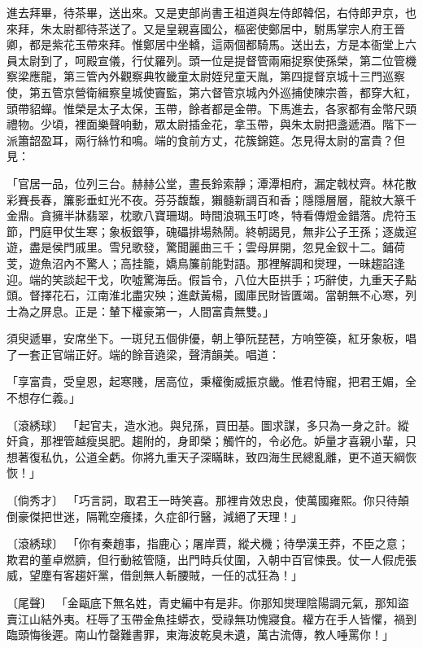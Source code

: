 \begin{showcontents}{}
進去拜畢，待茶畢，送出來。又是吏部尚書王祖道與左侍郎韓侶，右侍郎尹京，也來拜，朱太尉都待茶送了。又是皇親喜國公，樞密使鄭居中，駙馬掌宗人府王晉卿，都是紫花玉帶來拜。惟鄭居中坐轎，這兩個都騎馬。送出去，方是本衙堂上六員太尉到了，呵殿宣儀，行仗羅列。頭一位是提督管兩廂捉察使孫榮，第二位管機察梁應龍，第三管內外觀察典牧畿童太尉姪兒童天胤，第四提督京城十三門巡察使，第五管京營衛緝察皇城使竇監，第六督管京城內外巡捕使陳宗善，都穿大紅，頭帶貂蟬。惟榮是太子太保，玉帶，餘者都是金帶。下馬進去，各家都有金幣尺頭禮物。少頃，裡面樂聲响動，眾太尉插金花，拿玉帶，與朱太尉把盞遞酒。階下一派簫韶盈耳，兩行絲竹和鳴。端的食前方丈，花簇錦筵。怎見得太尉的富貴？但見：

「官居一品，位列三台。赫赫公堂，晝長鈴索靜；潭潭相府，漏定戟杖齊。林花散彩賽長春，簾影垂虹光不夜。芬芬馥馥，獺髓新調百和香；隱隱層層，龍紋大篆千金鼎。貪擁半牀翡翠，枕歌八寶珊瑚。時間浪珮玉叮咚，特看傳燈金錯落。虎符玉節，門庭甲仗生寒；象板銀箏，磈礧排場熱鬧。終朝謁見，無非公子王孫；逐歲逭遊，盡是侯門戚里。雪兒歌發，驚聞麗曲三千；雲母屏開，忽見金釵十二。鋪荷芰，遊魚沼內不驚人；高挂籠，嬌鳥簾前能對語。那裡解調和爕理，一昧趨諂逢迎。端的笑談起干戈，吹噓驚海岳。假旨令，八位大臣拱手；巧辭使，九重天子點頭。督擇花石，江南淮北盡灾殃；進獻黃楊，國庫民財皆匱竭。當朝無不心寒，列士為之屏息。正是：輦下權豪第一，人間富貴無雙。」

須臾遞畢，安席坐下。一斑兒五個俳優，朝上箏阮琵琶，方响箜篌，紅牙象板，唱了一套正官端正好。端的餘音遶梁，聲清韻美。唱道：

「享富貴，受皇恩，起寒賤，居高位，秉權衡威振京畿。惟君恃寵，把君王媚，全不想存仁義。」

〔滾綉球〕  「起官夫，造水池。與兒孫，買田基。圖求謀，多只為一身之計。縱奸貪，那裡管越瘦吳肥。趨附的，身即榮；觸忤的，令必危。妒量才喜親小輩，只想著復私仇，公道全虧。你將九重天子深瞞眛，致四海生民總亂離，更不道天綱恢恢！」

〔倘秀才〕  「巧言詞，取君王一時笑喜。那裡肯效忠良，使萬國雍熙。你只待顛倒豪傑把世迷，隔靴空癢揉，久症卻行醫，減絕了天理！」

〔滾綉球〕  「你有秦趙事，指鹿心；屠岸賈，縱犬機；待學漢王莽，不臣之意；欺君的董卓燃臍，但行動絃管隨，出門時兵仗圍，入朝中百官悚畏。仗一人假虎張威，望塵有客趨奸黨，借劍無人斬腰賊，一任的忒狂為！」

〔尾聲〕  「金甌底下無名姓，青史編中有是非。你那知爕理陰陽調元氣，那知盜賣江山結外夷。枉辱了玉帶金魚挂蟒衣，受祿無功愧寢食。權方在手人皆懼，禍到臨頭悔後遲。南山竹罄難書罪，東海波乾臭未遺，萬古流傳，教人唾罵你！」


\end{showcontents}
